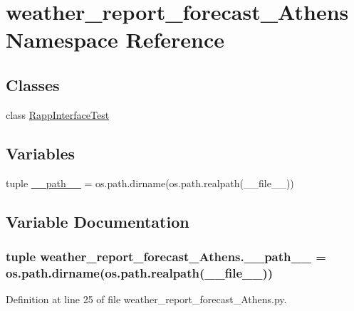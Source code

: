 \hypertarget{namespaceweather__report__forecast__Athens}{\section{weather\-\_\-report\-\_\-forecast\-\_\-\-Athens Namespace Reference}
\label{namespaceweather__report__forecast__Athens}
}
\subsection*{Classes}
\begin{DoxyCompactItemize}
\item 
class \hyperlink{classweather__report__forecast__Athens_1_1RappInterfaceTest}{Rapp\-Interface\-Test}
\end{DoxyCompactItemize}
\subsection*{Variables}
\begin{DoxyCompactItemize}
\item 
tuple \hyperlink{namespaceweather__report__forecast__Athens_a03bbd05848874c113db4fe03196f40d6}{\-\_\-\-\_\-path\-\_\-\-\_\-} = os.\-path.\-dirname(os.\-path.\-realpath(\-\_\-\-\_\-file\-\_\-\-\_\-))
\end{DoxyCompactItemize}


\subsection{Variable Documentation}
\hypertarget{namespaceweather__report__forecast__Athens_a03bbd05848874c113db4fe03196f40d6}{
\subsubsection[{\-\_\-\-\_\-path\-\_\-\-\_\-}]{\setlength{\rightskip}{0pt plus 5cm}tuple weather\-\_\-report\-\_\-forecast\-\_\-\-Athens.\-\_\-\-\_\-path\-\_\-\-\_\- = os.\-path.\-dirname(os.\-path.\-realpath(\-\_\-\-\_\-file\-\_\-\-\_\-))}}\label{namespaceweather__report__forecast__Athens_a03bbd05848874c113db4fe03196f40d6}


Definition at line 25 of file weather\-\_\-report\-\_\-forecast\-\_\-\-Athens.\-py.

